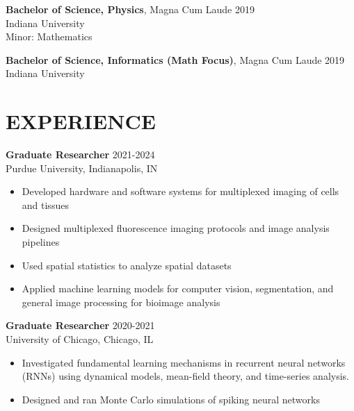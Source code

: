 \documentclass[margin, 10pt]{res} %
\begin{document}
\begin{resume}
\textbf{Bachelor of Science, Physics}, Magna Cum Laude \hfill 2019\\
Indiana University\\
Minor: Mathematics 

\textbf{Bachelor of Science, Informatics (Math Focus)}, Magna Cum Laude \hfill 2019\\
Indiana University\\


 
\section{EXPERIENCE}

\textbf{Graduate Researcher} \hfill 2021-2024 \\
Purdue University, Indianapolis, IN

\begin{itemize} \itemsep -2pt %

\item Developed hardware and software systems for multiplexed imaging of cells and tissues
\item Designed multiplexed fluorescence imaging protocols and image analysis pipelines
\item Used spatial statistics to analyze spatial datasets
\item Applied machine learning models for computer vision, segmentation, and general image processing for bioimage analysis

\end{itemize}

\textbf{Graduate Researcher} \hfill 2020-2021 \\
University of Chicago, Chicago, IL

\begin{itemize} \itemsep -2pt %

\item Investigated fundamental learning mechanisms in recurrent neural networks (RNNs) using dynamical models, mean-field theory, and time-series analysis. 

\item Designed and ran Monte Carlo simulations of spiking neural networks 
 

\end{itemize}
\end{resume}
\end{document}
